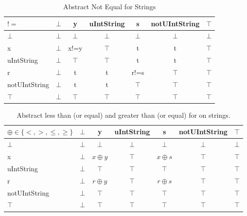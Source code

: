 \begin{table}[htbp]
\centering
\begin{tabular}{l|cccccc}
$!=$          & $\bot$ & y      & uIntString & s      & notUIntString & $\top$ \\\hline
$\bot$        & $\bot$ & $\bot$ & $\bot$     & $\bot$ & $\bot$        & $\bot$ \\
x             & $\bot$ & x!=y   & $\top$     & t      & t             & $\top$ \\
uIntString    & $\bot$ & $\top$ & $\top$     & t      & t             & $\top$ \\
r             & $\bot$ & t      & t          & r!=s   & $\top$        & $\top$ \\
notUIntString & $\bot$ & t      & t          & $\top$ & $\top$        & $\top$ \\
$\top$        & $\bot$ & $\top$ & $\top$     & $\top$ & $\top$        & $\top$
\end{tabular}
\caption{Abstract Not Equal for Strings}
\label{tab:abstract_not_equal_string}
\end{table}

\begin{table}[htbp]
\centering
\begin{tabular}{l|cccccc}
$\oplus\in \{<,>,\leq, \geq\}$           & $\bot$ & y      & uIntString & s      & notUIntString & $\top$ \\\hline
$\bot$        & $\bot$ & $\bot$ & $\bot$     & $\bot$ & $\bot$        & $\bot$ \\
x             & $\bot$ & $x\oplus y$ & $\top$     & $x\oplus s$    & $\top$        & $\top$ \\
uIntString    & $\bot$ & $\top$ & $\top$     & $\top$ & $\top$        & $\top$ \\
r             & $\bot$ & $r\oplus y$    & $\top$     & $r\oplus s$    & $\top$        & $\top$ \\
notUIntString & $\bot$ & $\top$ & $\top$     & $\top$ & $\top$        & $\top$ \\
$\top$        & $\bot$ & $\top$ & $\top$     & $\top$ & $\top$        & $\top$
\end{tabular}
\caption{Abstract less than (or equal) and greater than (or equal) for on strings.}
\label{tab:abstract_less_than_string}
\end{table}

